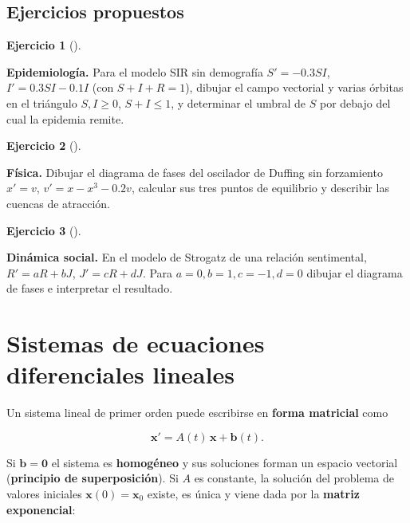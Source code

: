 \documentclass[
  spanish,
  a4paper,
]{scrreport}
\theoremstyle{definition}
\newtheorem{exercise}{Ejercicio}[chapter]
\theoremstyle{remark}
\begin{document}
\section{Ejercicios propuestos}\label{ejercicios-propuestos-1}

\begin{exercise}[]\protect\hypertarget{exr-propuesto-sir-fases}{}\label{exr-propuesto-sir-fases}

\textbf{Epidemiología.} Para el modelo SIR sin demografía
\(S' = -0.3 SI\), \(I' = 0.3SI - 0.1I\) (con \(S+I+R=1\)), dibujar el
campo vectorial y varias órbitas en el triángulo \(S, I \ge 0\),
\(S + I \le 1\), y determinar el umbral de \(S\) por debajo del cual la
epidemia remite.

\end{exercise}

\begin{exercise}[]\protect\hypertarget{exr-propuesto-oscilador-fases}{}\label{exr-propuesto-oscilador-fases}

\textbf{Física.} Dibujar el diagrama de fases del oscilador de Duffing
sin forzamiento \(x' = v\), \(v' = x - x^3 - 0.2v\), calcular sus tres
puntos de equilibrio y describir las cuencas de atracción.

\end{exercise}

\begin{exercise}[]\protect\hypertarget{exr-propuesto-romeo}{}\label{exr-propuesto-romeo}

\textbf{Dinámica social.} En el modelo de Strogatz de una relación
sentimental, \(R' = aR + bJ\), \(J' = cR + dJ\). Para
\(a = 0, b = 1, c = -1, d = 0\) dibujar el diagrama de fases e
interpretar el resultado.

\end{exercise}


\chapter{Sistemas de ecuaciones diferenciales
lineales}\label{sistemas-de-ecuaciones-diferenciales-lineales}

Un sistema lineal de primer orden puede escribirse en \textbf{forma
matricial} como

\[
\mathbf{x}' = A(t)\,\mathbf{x} + \mathbf{b}(t).
\]

Si \(\mathbf{b}=\mathbf{0}\) el sistema es \textbf{homogéneo} y sus
soluciones forman un espacio vectorial (\textbf{principio de
superposición}). Si \(A\) es constante, la solución del problema de
valores iniciales \(\mathbf{x}(0)=\mathbf{x}_0\) existe, es única y
viene dada por la \textbf{matriz exponencial}:
\end{document}
